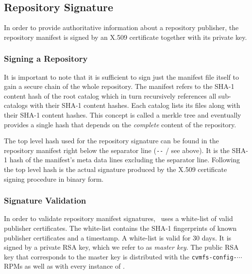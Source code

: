 \subsection{Repository Signature}
\label{sct:cvmfspublished:signature}
In order to provide authoritative information about a repository publisher, the repository manifest is signed by an X.509 certificate together with its private key.

\subsubsection{Signing a Repository}
It is important to note that it is sufficient to sign just the manifest file itself to gain a secure chain of the whole repository.
The manifest refers to the SHA-1 content hash of the root catalog which in turn recursively references all sub-catalogs with their SHA-1 content hashes.
Each catalog lists its files along with their SHA-1 content hashes.
This concept is called a merkle tree and eventually provides a single hash that depends on the \textit{complete} content of the repository.

The top level hash used for the repository signature can be found in the repository manifest right below the separator line (\texttt{-{}-} / see above).
It is the SHA-1 hash of the manifest's meta data lines excluding the separator line.
Following the top level hash is the actual signature produced by the X.509 certificate signing procedure in binary form.

\subsubsection{Signature Validation}
In order to validate repository manifest signatures, \cvmfs\ uses a white-list of valid publisher certificates.
The white-list contains the SHA-1 fingerprints of known publisher certificates and a timestamp.
A white-list is valid for 30 days.
It is signed by a private RSA key, which we refer to as \emph{master key}.
The public RSA key that corresponds to the master key is distributed with the \texttt{cvmfs-config-$\cdots$} RPMs as well as with every instance of \cernvm.

